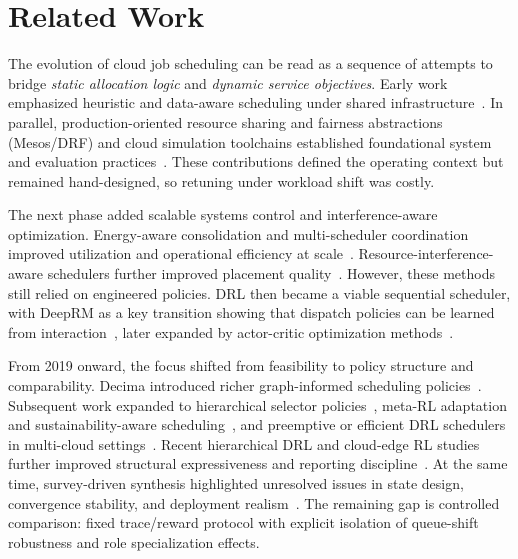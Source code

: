 \documentclass[journal]{IEEEtran}
\begin{document}
\section{\textbf{Related Work}} \label{Sec2}
The evolution of cloud job scheduling can be read as a sequence of attempts to bridge \emph{static allocation logic} and \emph{dynamic service objectives}. Early work emphasized heuristic and data-aware scheduling under shared infrastructure~\cite{isard2009quincy, zaharia2010delay, armbrust2010view}. In parallel, production-oriented resource sharing and fairness abstractions (Mesos/DRF) and cloud simulation toolchains established foundational system and evaluation practices~\cite{hindman2011mesos, ghodsi2011drf, calheiros2011cloudsim}. These contributions defined the operating context but remained hand-designed, so retuning under workload shift was costly.

The next phase added scalable systems control and interference-aware optimization. Energy-aware consolidation and multi-scheduler coordination improved utilization and operational efficiency at scale~\cite{beloglazov2012energy, schwarzkopf2013omega, ousterhout2013sparrow, verma2015borg, burns2016borg}. Resource-interference-aware schedulers further improved placement quality~\cite{delimitrou2013paragon, delimitrou2014quasar}. However, these methods still relied on engineered policies. DRL then became a viable sequential scheduler, with DeepRM as a key transition showing that dispatch policies can be learned from interaction~\cite{mao2016resource}, later expanded by actor-critic optimization methods~\cite{mnih2016asynchronous, schulman2017proximal}.

From 2019 onward, the focus shifted from feasibility to policy structure and comparability. Decima introduced richer graph-informed scheduling policies~\cite{decima2019}. Subsequent work expanded to hierarchical selector policies~\cite{zhou2022selector}, meta-RL adaptation and sustainability-aware scheduling~\cite{xiu2023mrlcc, wang2023erlfc}, and preemptive or efficient DRL schedulers in multi-cloud settings~\cite{cheng2024preemptive, mangalampalli2024efficient}. Recent hierarchical DRL and cloud-edge RL studies further improved structural expressiveness and reporting discipline~\cite{zhang2024hdrl, zhang2025s41598}. At the same time, survey-driven synthesis highlighted unresolved issues in state design, convergence stability, and deployment realism~\cite{zhou2024aireview}. The remaining gap is controlled comparison: fixed trace/reward protocol with explicit isolation of queue-shift robustness and role specialization effects.
\end{document}
